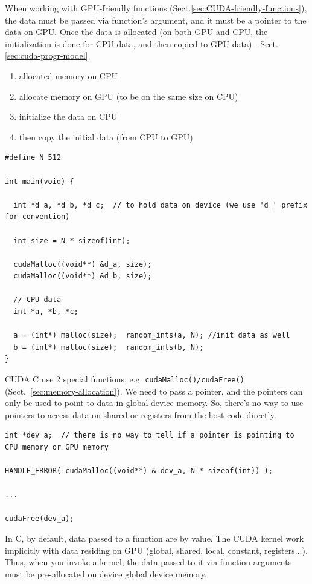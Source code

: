 When working with GPU-friendly functions
(Sect.\ref{sec:CUDA-friendly-functions}), the data must be passed via function's
argument, and it must be a pointer to the data on GPU. Once the data is
allocated (on both GPU and CPU, the initialization is done for CPU data, and
then copied to GPU data) - Sect.\ref{sec:cuda-progr-model}

\begin{enumerate}
  \item allocated memory on CPU
  
  \item allocate memory on GPU (to be on the same size on CPU)
  
  \item initialize the data on CPU
  
  \item then copy the initial data (from CPU to GPU)
\end{enumerate}

\begin{lstlisting}
#define N 512

int main(void) {

  int *d_a, *d_b, *d_c;  // to hold data on device (we use 'd_' prefix for convention)
  
  int size = N * sizeof(int);
  
  cudaMalloc((void**) &d_a, size);
  cudaMalloc((void**) &d_b, size);
  
  // CPU data
  int *a, *b, *c;
  
  a = (int*) malloc(size);  random_ints(a, N); //init data as well
  b = (int*) malloc(size);  random_ints(b, N);
}
\end{lstlisting}


CUDA C use 2 special functions,
e.g. \verb!cudaMalloc()/cudaFree()! (Sect.~\ref{sec:memory-allocation}). We need
to pass a pointer, and the pointers can only be used to point to data
in global device memory. So, there's no way to use pointers to access
data on shared or registers from the host code directly.
\begin{lstlisting}
int *dev_a;  // there is no way to tell if a pointer is pointing to CPU memory or GPU memory

HANDLE_ERROR( cudaMalloc((void**) & dev_a, N * sizeof(int)) );

...

cudaFree(dev_a);
\end{lstlisting}

In C, by default, data passed to a function are by value. The CUDA
kernel work implicitly with data residing on GPU (global, shared,
local, constant, registers...). Thus, when you invoke a kernel, the
data passed to it via function arguments must be pre-allocated on
device global device memory.

